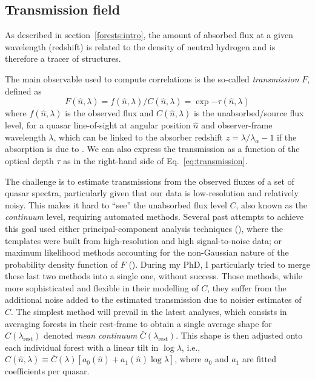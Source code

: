 \subsection{Transmission field}
\label{forests:bao:transmission}

As described in section~\ref{forests:intro}, the amount of absorbed 
flux at a given wavelength (redshift) is related to the density 
of neutral hydrogen and is therefore a tracer of structures.  

The main observable used to compute correlations is the so-called
\emph{transmission} $F$, defined as 
\begin{equation}
    F(\hat{n}, \lambda) = f(\hat{n}, \lambda)/C(\hat{n}, \lambda) = \exp{-\tau(\hat{n}, \lambda)}
    \label{eq:transmission}
\end{equation} 
where 
$f(\hat{n}, \lambda)$ is the observed flux and 
$C(\hat{n}, \lambda)$ is the unabsorbed/source flux level, 
for a quasar line-of-sight at angular position $\hat{n}$ 
and observer-frame wavelength $\lambda$, which can be linked to the
absorber redshift $z = \lambda/\lambda_\alpha - 1$ if the absorption is 
due to \lya. We can also express the transmission as a function of the 
optical depth $\tau$ as in the right-hand side of Eq.~\ref{eq:transmission}.

The challenge is to estimate transmissions from the observed fluxes of a set of quasar
spectra, particularly given that our data is low-resolution and relatively noisy.
This makes it hard to ``see'' the unabsorbed flux level $C$, also known as the 
\emph{continuum} level, requiring automated methods. 
Several past attempts to achieve this goal
used either principal-component analysis techniques 
(\cite{leeMeanfluxregulatedPrincipalComponent2012}), where the templates were built from 
high-resolution and high signal-to-noise data; or maximum likelihood methods accounting
for the non-Gaussian nature of the probability density function of $F$ 
(\cite{buscaBaryonAcousticOscillations2013}). 
During my PhD, I particularly tried to merge these 
last two methods into a single one, without success. 
Those methods, while more sophisticated and flexible in their modelling of $C$, 
they suffer from the additional noise added to the estimated transmission 
due to noisier estimates of $C$. 
The simplest method will prevail in the latest
analyses, which consists in averaging forests in their rest-frame to obtain a
single average shape for $C(\lambda_\text{rest})$ denoted \emph{mean continuum} $\bar{C}(\lambda_\text{rest})$. 
This shape is then adjusted onto each individual forest with a linear tilt in $\log \lambda$,
i.e., $C(\hat{n}, \lambda) \equiv \bar{C}(\lambda) [ a_0(\hat{n}) + a_1(\hat{n})\log \lambda]$,
where $a_0$ and $a_1$ are fitted coefficients per quasar. 

